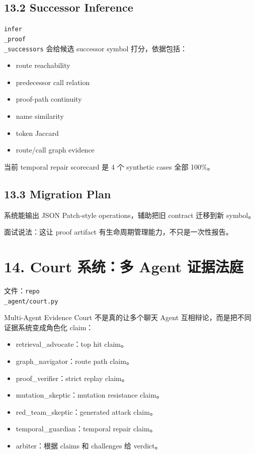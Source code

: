 \documentclass[UTF8,12pt,openany]{ctexbook}
\begin{document}
\subsection{13.2 Successor Inference}

\texttt{infer\\_proof\\_successors} 会给候选 successor symbol 打分，依据包括：\par

\begin{itemize}
\item route reachability
\item predecessor call relation
\item proof-path continuity
\item name similarity
\item token Jaccard
\item route/call graph evidence
\end{itemize}

当前 temporal repair scorecard 是 4 个 synthetic cases 全部 100\%。\par

\subsection{13.3 Migration Plan}

系统能输出 JSON Patch-style operations，辅助把旧 contract 迁移到新 symbol。\par

面试说法：这让 proof artifact 有生命周期管理能力，不只是一次性报告。\par

\section{14. Court 系统：多 Agent 证据法庭}

文件：\texttt{repo\\_agent/court.py}\par

Multi-Agent Evidence Court 不是真的让多个聊天 Agent 互相辩论，而是把不同证据系统变成角色化 claim：\par

\begin{itemize}
\item retrieval\_advocate：top hit claim。
\item graph\_navigator：route path claim。
\item proof\_verifier：strict replay claim。
\item mutation\_skeptic：mutation resistance claim。
\item red\_team\_skeptic：generated attack claim。
\item temporal\_guardian：temporal repair claim。
\item arbiter：根据 claims 和 challenges 给 verdict。
\end{itemize}
\end{document}
